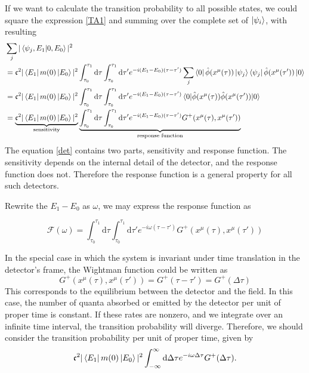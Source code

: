 \documentclass[12pt]{article}
\numberwithin{equation}{subsection}
\theoremstyle{mystyle}{\newtheorem{definition}{Definition}[subsection]}
\theoremstyle{mystyle}{\newtheorem{theorem}[definition]{Theorem}}
\theoremstyle{mystyle}{\newtheorem*{remark}{Remark}}
\theoremstyle{mystyle}{\newtheorem{example}{Example}[subsection]}
\theoremstyle{mystyle}{\newtheorem{examples}{Examples}[subsection]}
\theoremstyle{mystyle}{\newtheorem{cthm}{}[subsection]}
\newcommand{\id}{\mathrm{d}}
\begin{document}
If we want to calculate the transition probability to all possible states, we could square the expression \ref{TA1} and 
summing over the complete set of \(\ket{\psi_i}\), with resulting 
\begin{align}
  &\sum_{j}|\braket{\psi_j,E_1}{0,E_0}|^2\\
  &=\mathfrak{c}^2|\bra{E_1}m(0)\ket{E_0}|^2\int_{\tau_0}^{\tau_1}\id \tau
  \int_{\tau_0}^{\tau_1}\id \tau'e^{-i(E_1-E_0)(\tau-\tau')}\sum_{j}\bra{0}\hat{\phi}(x^{\mu}(\tau))\ket{\psi_j}\bra{\psi_j}\hat{\phi}(x^{\mu}(\tau'))\ket{0}\\
  &=\mathfrak{c}^2|\bra{E_1}m(0)\ket{E_0}|^2\int_{\tau_0}^{\tau_1}\id \tau
  \int_{\tau_0}^{\tau_1}\id \tau'e^{-i(E_1-E_0)(\tau-\tau')}\expval{\hat{\phi}(x^{\mu}(\tau))\hat{\phi}(x^{\mu}(\tau'))}{0}\\
  &=\underbrace{\mathfrak{c}^2|\bra{E_1}m(0)\ket{E_0}|^2}_{\text{sensitivity}}\underbrace{\int_{\tau_0}^{\tau_1}\id \tau
  \int_{\tau_0}^{\tau_1}\id \tau'e^{-i(E_1-E_0)(\tau-\tau')}G^+(x^{\mu}(\tau),x^{\mu}(\tau'))}_{\text{response function}}\label{det}
\end{align}
The equation \ref{det} contains two parts, sensitivity and response function. 
The sensitivity depends on the internal detail of the detector, and the response function does not. 
Therefore the response function is a general property for all such detectors.

Rewrite the \(E_1-E_0\) as \(\omega\), we may express the response function as 
\begin{cthm}
  \[\mathcal{F}(\omega)=\int_{\tau_0}^{\tau_1}\id \tau\int_{\tau_0}^{\tau_1}\id \tau'e^{-i\omega(\tau-\tau')}G^+(x^{\mu}(\tau),x^{\mu}(\tau')) \]
\end{cthm}
In the special case in which the system is invariant under time translation in the detector's frame, the Wightman function could be written as 
\begin{equation}
  G^+(x^{\mu}(\tau),x^{\mu}(\tau'))=G^+(\tau-\tau')=G^+(\Delta \tau)
\end{equation}
This corresponds to the equilibrium between the detector and the field. 
In this case, the number of quanta absorbed or emitted by the detector per unit of proper time is constant. 
If these rates are nonzero, and we integrate over an infinite time interval, the transition probability will diverge.
Therefore, we should consider the transition probability per unit of proper time, given by 
\begin{equation}
  \mathfrak{c}^2|\bra{E_1}m(0)\ket{E_0}|^2\int_{-\infty}^{\infty}\id \Delta\tau e^{-i\omega\Delta \tau}G^+(\Delta \tau).
\end{equation}
\end{document}
